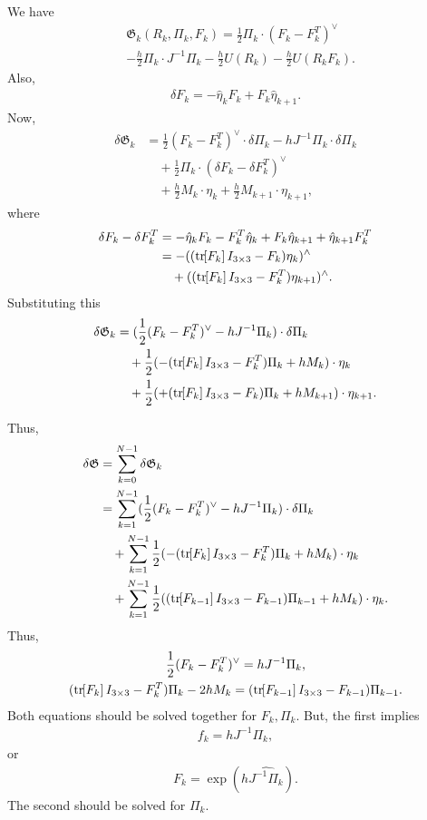 \documentclass[letterpaper, 10pt, conference]{ieeeconf}
\newcommand{\bracket}[1]{\ensuremath{\left[ #1 \right]}}
\newcommand{\tr}[1]{\mbox{tr}\ensuremath{\negthickspace\bracket{#1}}}
\begin{document}
We have
\begin{align*}
    &\mathfrak{G}_k(R_k,\Pi_k,F_k) = \frac{1}{2}\Pi_k \cdot (F_k-F_k^T)^\vee\\
    &- \frac{h}{2} \Pi_k\cdot J^{-1}\Pi_k -\frac{h}{2}U(R_k) -\frac{h}{2} U(R_kF_k).
\end{align*}
Also,
\begin{align*}
    \delta F_k = -\hat\eta_k F_k + F_k\hat\eta_{k+1}.
\end{align*}
Now,
\begin{align*}
    \delta \mathfrak{G}_k & = \frac{1}{2}(F_k-F_k^T)^\vee \cdot \delta \Pi_k -h J^{-1}\Pi_k \cdot \delta\Pi_k \\
                          &\quad + \frac{1}{2} \Pi_k \cdot (\delta F_k -\delta F_k^T)^\vee\\
   &\quad +\frac{h}{2} M_k\cdot \eta_k + \frac{h}{2} M_{k+1} \cdot \eta_{k+1},
\end{align*}
where
\begin{align*}
    \delta F_k -\delta F_k^T & = -\hat\eta_k F_k -F_k^T \hat\eta_k + F_k\hat\eta_{k+1} + \hat\eta_{k+1} F_k^T \\
    & = -((\tr{F_k}I_{3\times 3}-F_k) \eta_k )^\wedge \\
    & \quad  + ((\tr{F_k}I_{3\times 3}-F_k^T) \eta_{k+1} )^\wedge.
\end{align*}
Substituting this
\begin{align*}
    \delta \mathfrak{G}_k & = (\frac{1}{2}(F_k-F_k^T)^\vee  -h J^{-1}\Pi_k) \cdot \delta\Pi_k \\
                          &\quad +\frac{1}{2} ( -(\tr{F_k}I_{3\times 3} -F_k^T)\Pi_k + hM_k ) \cdot \eta_k\\
                          &\quad +\frac{1}{2} ( +(\tr{F_k}I_{3\times 3} -F_k)\Pi_k + hM_{k+1} ) \cdot \eta_{k+1}.
\end{align*}


Thus,
\begin{align*}
    \delta\mathfrak{G} & = \sum_{k=0}^{N-1} \delta\mathfrak{G}_k \\
                       & = \sum_{k=1}^{N-1} (\frac{1}{2}(F_k-F_k^T)^\vee  -h J^{-1}\Pi_k) \cdot \delta\Pi_k \\
                       &\quad + \sum_{k=1}^{N-1} \frac{1}{2}( -(\tr{F_k}I_{3\times 3} -F_k^T)\Pi_k + h M_k ) \cdot \eta_k\\
                       &\quad + \sum_{k=1}^{N-1} \frac{1}{2}( (\tr{F_{k-1}}I_{3\times 3} -F_{k-1})\Pi_{k-1} + h M_{k} ) \cdot \eta_{k}.
\end{align*}
Thus,
\begin{gather}
    \frac{1}{2}(F_k -F_k^T)^\vee = hJ^{-1}\Pi_k,\\
(\tr{F_k}I_{3\times 3} -F_k^T)\Pi_k - 2 h M_k = 
(\tr{F_{k-1}}I_{3\times 3} -F_{k-1})\Pi_{k-1} .
\end{gather}
Both equations should be solved together for $F_k,\Pi_k$.
But, the first implies
\begin{align*}
    f_k = h J^{-1}\Pi_k,
\end{align*}
or
\begin{align*}
    F_k = \exp (h \widehat{J^{-1}\Pi_k}).
\end{align*}
The second should be solved for $\Pi_k$.
\end{document}
